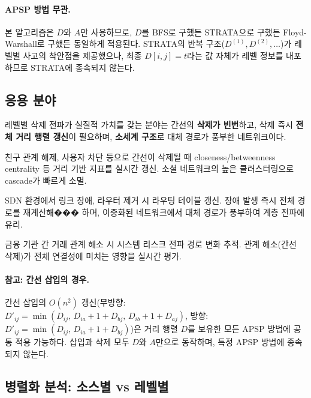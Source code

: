 \documentclass[11pt,a4paper]{article}
\begin{document}
\paragraph{APSP 방법 무관.}
본 알고리즘은 $D$와 $A$만 사용하므로, $D$를 BFS로 구했든 STRATA으로 구했든 Floyd-Warshall로 구했든 동일하게 적용된다. STRATA의 반복 구조($D^{(1)}, D^{(2)}, \ldots$)가 레벨별 사고의 착안점을 제공했으나, 최종 $D[i,j] = t$라는 값 자체가 레벨 정보를 내포하므로 STRATA에 종속되지 않는다.

\subsection{응용 분야}

레벨별 삭제 전파가 실질적 가치를 갖는 분야는 간선의 \textbf{삭제가 빈번}하고, 삭제 즉시 \textbf{전체 거리 행렬 갱신}이 필요하며, \textbf{소세계 구조}로 대체 경로가 풍부한 네트워크이다.

\begin{description}[style=nextline, leftmargin=1.2em, labelwidth=0em, font=\bfseries]
\item[1. 소셜 네트워크 친구 해제/차단]
친구 관계 해제, 사용자 차단 등으로 간선이 삭제될 때 closeness/betweenness centrality 등 거리 기반 지표를 실시간 갱신. 소셜 네트워크의 높은 클러스터링으로 cascade가 빠르게 소멸.

\item[2. 통신 네트워크 링크 장애]
SDN 환경에서 링크 장애, 라우터 제거 시 라우팅 테이블 갱신. 장애 발생 즉시 전체 경로를 재계산해��� 하며, 이중화된 네트워크에서 대체 경로가 풍부하여 계층 전파에 유리.

\item[3. 금융 거래 네트워크 관계 해소]
금융 기관 간 거래 관계 해소 시 시스템 리스크 전파 경로 변화 추적. 관계 해소(간선 삭제)가 전체 연결성에 미치는 영향을 실시간 평가.
\end{description}

\paragraph{참고: 간선 삽입의 경우.}
간선 삽입의 $O(n^2)$ 갱신(무방향: $D'_{ij} = \min(D_{ij},\, D_{ia}+1+D_{bj},\, D_{ib}+1+D_{aj})$, 방향: $D'_{ij} = \min(D_{ij},\, D_{ia}+1+D_{bj})$)은 거리 행렬 $D$를 보유한 모든 APSP 방법에 공통 적용 가능하다. 삽입과 삭제 모두 $D$와 $A$만으로 동작하며, 특정 APSP 방법에 종속되지 않는다.

\subsection{병렬화 분석: 소스별 vs 레벨별}
\end{document}
